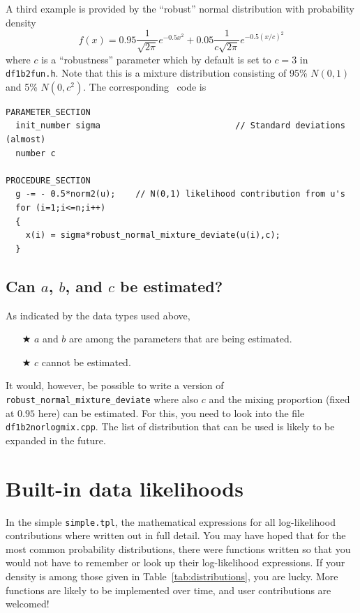 \documentclass{admbmanual}
\begin{document}
A third example is provided by the ``robust'' normal distribution with
probability density
\begin{equation*}
  f(x) = 0.95\frac{1}{\sqrt{2\pi}}e^{-0.5x^2}
  + 0.05\frac{1}{c\sqrt{2\pi}}e^{-0.5(x/c)^2}
\end{equation*}
where $c$ is a ``robustness'' parameter which by default is set to $c=3$ in
\texttt{df1b2fun.h}. Note that this is a mixture distribution consisting of 95\%
$N(0,1)$ and 5\% $N(0,c^2)$. The corresponding \scAR\ code is
\begin{lstlisting}
PARAMETER_SECTION
  init_number sigma                           // Standard deviations (almost)
  number c

PROCEDURE_SECTION
  g -= - 0.5*norm2(u);    // N(0,1) likelihood contribution from u's
  for (i=1;i<=n;i++)
  {
    x(i) = sigma*robust_normal_mixture_deviate(u(i),c);
  }
\end{lstlisting}

\subsection{Can $a$, $b$, and $c$ be estimated?}

As indicated by the data types used above,
\begin{itemize}
  \item[$\bigstar$]
  $a$ and $b$ are among the parameters that are being estimated.
  \item[$\bigstar$]
  $c$ cannot be estimated.
\end{itemize}
It would, however, be possible to write a version of
\texttt{robust\_normal\_mixture\_deviate} where also $c$ and the mixing
proportion (fixed at $0.95$ here) can be estimated. For this, you need to look
into the file \texttt{df1b2norlogmix.cpp}. The list of distribution that can be
used is likely to be expanded in the future.

\section{Built-in data likelihoods}

In the simple \texttt{simple.tpl}, the mathematical expressions for all
log-likelihood contributions where written out in full detail. You may have
hoped that for the most common probability distributions, there were functions
written so that you would not have to remember or look up their log-likelihood
expressions. If your density is among those given in
Table~\ref{tab:distributions}, you are lucky. More functions are likely to be
implemented over time, and user contributions are welcomed!
\end{document}

